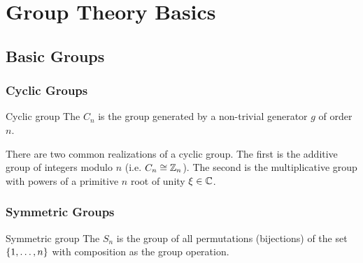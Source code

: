 \documentclass{styles/tufte}
\author{Jiaming (George) Yu}
\date{\today}
\begin{document}
\maketitle
\tableofcontents
\newpage



\section{Group Theory Basics}


\subsection{Basic Groups}

  \subsubsection{Cyclic Groups}

    \begin{definition}{Cyclic group}{}
      The  $C_n$ is the group generated by a non-trivial generator $g$ of order $n$.
    \end{definition}
    
    There are two common realizations of a cyclic group. The first is the additive group of integers modulo $n$ (i.e. $C_n \cong \mathbb{Z}_n$). The second is the multiplicative group with powers of a primitive $n$ root of unity $\xi \in \mathbb{C}$.
  
  
  \subsubsection{Symmetric Groups}
    
    \begin{definition}{Symmetric group}{}
      The  $S_n$ is the group of all permutations (bijections) of the set $\set{1, \dots, n}$ with composition as the group operation.
    \end{definition}
\end{document}

